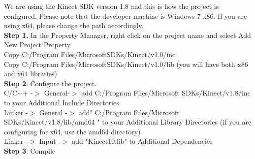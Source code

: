 We are using the Kinect SDK version 1.8 and this is how the project is configured. Please note that the developer machine is Windows 7 x86. 
If you are using x64, please change the path accordingly.\\
\textbf{Step 1. } In the Property Manager, right click on the project name and select Add New Project Property\\
Copy C:/Program Files/MicrosoftSDKs/Kinect/v1.0/inc\\
Copy C:/Program Files/MicrosoftSDKs/Kinect/v1.0/lib (you will have both x86 and x64 libraries)\\
\textbf{Step 2}. Configure the project. \\
C/C++ -$>$ General-$>$ add C:/Program Files/Microsoft SDKs/Kinect/v1.8/inc to your Additional Include Directories\\
Linker -$>$ General -$>$ add" C:/Program Files/Microsoft SDKs/Kinect/v1.8/lib/amd64 "  to your Additional Library Directories (if you are configuring for x64, use the amd64 directory)\\
Linker -$>$ Input -$>$ add "Kinect10.lib" to Additional Dependencies\\
\textbf{Step 3}. Compile\\
